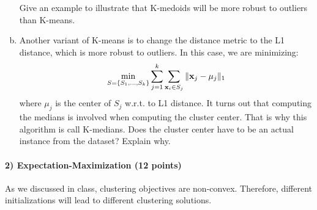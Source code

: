 \documentclass{article}
\newcommand{\vx}{{\bf x}}
\newcommand{\vxi}{{\bf x}_i}
\begin{document}
\begin{enumerate}[(a)]
		Give an example to illustrate that K-medoids will be more robust to outliers than K-means.

	\item Another variant of K-means is to change the distance metric to the L1 distance, which is more robust to outliers. In this case, we are minimizing:
		\begin{align}
			\min_{S=\{S_1,...,S_k\}}\sum_{j=1}^k\sum_{\vxi\in S_j}\|\vx_j-\mu_j\|_1
		\end{align}
		where $\mu_j$ is the center of $S_j$ w.r.t. to L1 distance. It turns out that computing the medians is involved when computing the cluster center. That is why this algorithm is call K-medians. Does the cluster center have to be an actual instance from the dataset? Explain why.
\end{enumerate}

\paragraph{2) Expectation-Maximization (12 points)} 

As we discussed in class, clustering objectives are non-convex. Therefore, different initializations will lead to different clustering solutions.
\end{document}

